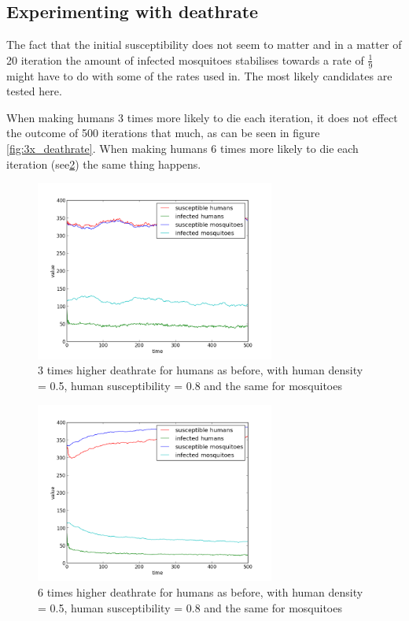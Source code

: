 \documentclass[a4paper]{report}
\begin{document}
\subsection{Experimenting with deathrate}
The fact that the initial susceptibility does not seem to matter and in a matter
of 20 iteration the amount of infected mosquitoes stabilises towards a rate of
$\frac{1}{9}$ might have to do with some of the rates used in. The most likely
candidates are tested here.

When making humans 3 times more likely to die each iteration, it does not effect
the outcome of 500 iterations that much, as can be seen in figure
\ref{fig:3x_deathrate}. When making humans 6 times more likely to die each iteration
(see\ref{fig:2_more_mosquitoes}) the same thing
happens.

\begin{figure}[htbp]
    \centering
    \includegraphics[width=0.7\textwidth]{05_08_05_08_higher_deathrate.png}
    \caption{3 times higher deathrate for humans as before, with human density =
        0.5, human susceptibility = 0.8 and the same for mosquitoes
    }
    \label{fig:more_mosquitoes}
\end{figure}

\begin{figure}[htbp]
    \centering
    \includegraphics[width=0.7\textwidth]{05_08_05_08_higher_deathrate_6x.png}
    \caption{6 times higher deathrate for humans as before, with human density =
        0.5, human susceptibility = 0.8 and the same for mosquitoes
    }
    \label{fig:2_more_mosquitoes}
\end{figure}
\end{document}
